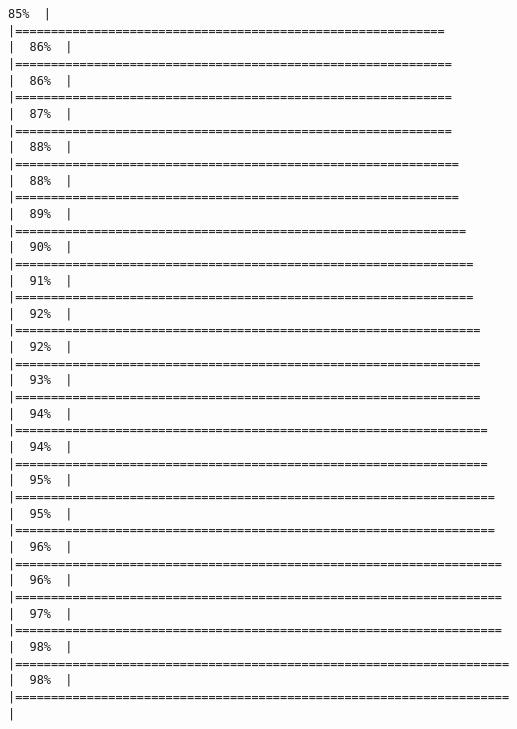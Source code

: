 \documentclass[
]{book}
\begin{document}
\begin{verbatim}
85%  |                                                                              |============================================================          |  86%  |                                                                              |=============================================================         |  86%  |                                                                              |=============================================================         |  87%  |                                                                              |=============================================================         |  88%  |                                                                              |==============================================================        |  88%  |                                                                              |==============================================================        |  89%  |                                                                              |===============================================================       |  90%  |                                                                              |================================================================      |  91%  |                                                                              |================================================================      |  92%  |                                                                              |=================================================================     |  92%  |                                                                              |=================================================================     |  93%  |                                                                              |=================================================================     |  94%  |                                                                              |==================================================================    |  94%  |                                                                              |==================================================================    |  95%  |                                                                              |===================================================================   |  95%  |                                                                              |===================================================================   |  96%  |                                                                              |====================================================================  |  96%  |                                                                              |====================================================================  |  97%  |                                                                              |====================================================================  |  98%  |                                                                              |===================================================================== |  98%  |                                                                              |===================================================================== |  
\end{verbatim}
\end{document}
